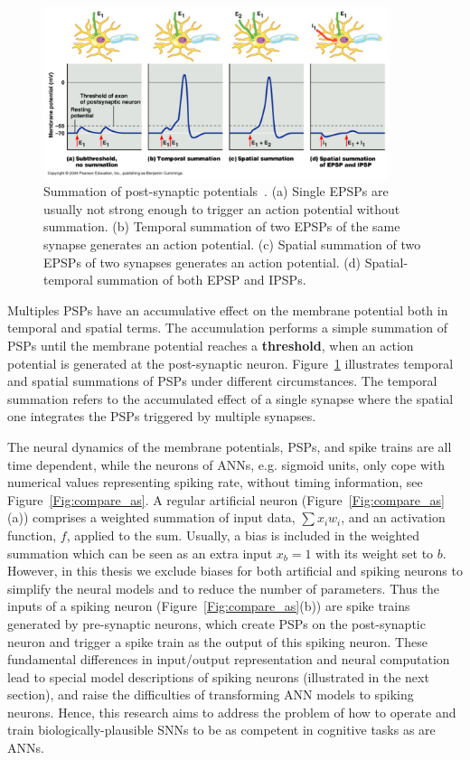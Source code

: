 \begin{figure}[bt!]
	\centering
	\includegraphics[width=0.9\textwidth]{pics_snn/psp.png}
	\caption{Summation of post-synaptic potentials~\citep{reece2011campbell}. 
		(a) Single EPSPs are usually not strong enough to trigger an action potential without summation. (b) Temporal summation of two EPSPs of the same synapse generates an action potential. (c) Spatial summation of two EPSPs of two synapses generates an action potential. (d) Spatial-temporal summation of both EPSP and IPSPs.
	}
	\label{Fig:psp_sum}
\end{figure}

Multiples PSPs have an accumulative effect on the membrane potential both in temporal and spatial terms.
The accumulation performs a simple summation of PSPs until the membrane potential reaches a \textbf{threshold}, when an action potential is generated at the post-synaptic neuron.
Figure~\ref{Fig:psp_sum} illustrates temporal and spatial summations of PSPs under different circumstances.
The temporal summation refers to the accumulated effect of a single synapse where the spatial one integrates the PSPs triggered by multiple synapses.

The neural dynamics of the membrane potentials, PSPs, and spike trains are all time dependent, while the neurons of ANNs, e.g. sigmoid units, only cope with numerical values representing spiking rate, without timing information, see Figure~\ref{Fig:compare_as}.
A regular artificial neuron (Figure~\ref{Fig:compare_as}(a)) comprises a weighted summation of input data, $\sum x_i w_i$, and an activation function, $f$, applied to the sum. Usually, a bias is included in the weighted summation which can be seen as an extra input $x_b = 1$ with its weight set to $b$.
However, in this thesis we exclude biases for both artificial and spiking neurons to simplify the neural models and to reduce the number of parameters.
Thus the inputs of a spiking neuron (Figure~\ref{Fig:compare_as}(b)) are spike trains generated by pre-synaptic neurons, which create PSPs on the post-synaptic neuron and trigger a spike train as the output of this spiking neuron.
These fundamental differences in input/output representation and neural computation lead to special model descriptions of spiking neurons (illustrated in the next section), and raise the difficulties of transforming ANN models to spiking neurons.
Hence, this research aims to address the problem of how to operate and train biologically-plausible SNNs to be as competent in cognitive tasks as are ANNs.

